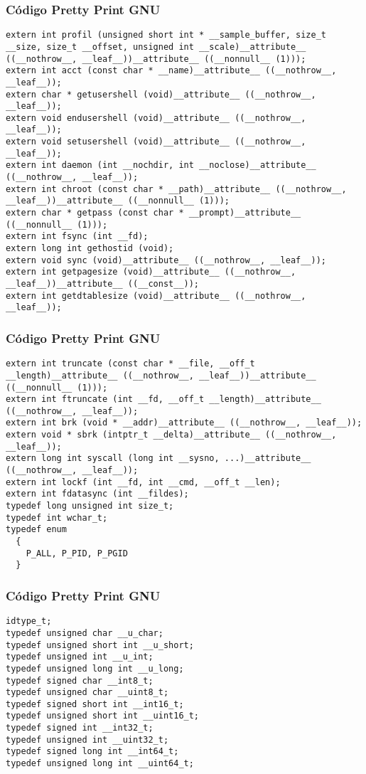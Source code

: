 \documentclass{beamer}
\begin{document}
\begin{frame}[fragile]
\frametitle{C\'odigo Pretty Print GNU}
\begin{verbatim}
extern int profil (unsigned short int * __sample_buffer, size_t __size, size_t __offset, unsigned int __scale)__attribute__ ((__nothrow__, __leaf__))__attribute__ ((__nonnull__ (1)));
extern int acct (const char * __name)__attribute__ ((__nothrow__, __leaf__));
extern char * getusershell (void)__attribute__ ((__nothrow__, __leaf__));
extern void endusershell (void)__attribute__ ((__nothrow__, __leaf__));
extern void setusershell (void)__attribute__ ((__nothrow__, __leaf__));
extern int daemon (int __nochdir, int __noclose)__attribute__ ((__nothrow__, __leaf__));
extern int chroot (const char * __path)__attribute__ ((__nothrow__, __leaf__))__attribute__ ((__nonnull__ (1)));
extern char * getpass (const char * __prompt)__attribute__ ((__nonnull__ (1)));
extern int fsync (int __fd);
extern long int gethostid (void);
extern void sync (void)__attribute__ ((__nothrow__, __leaf__));
extern int getpagesize (void)__attribute__ ((__nothrow__, __leaf__))__attribute__ ((__const__));
extern int getdtablesize (void)__attribute__ ((__nothrow__, __leaf__));
\end{verbatim}
\end{frame}
\begin{frame}[fragile]
\frametitle{C\'odigo Pretty Print GNU}
\begin{verbatim}
extern int truncate (const char * __file, __off_t __length)__attribute__ ((__nothrow__, __leaf__))__attribute__ ((__nonnull__ (1)));
extern int ftruncate (int __fd, __off_t __length)__attribute__ ((__nothrow__, __leaf__));
extern int brk (void * __addr)__attribute__ ((__nothrow__, __leaf__));
extern void * sbrk (intptr_t __delta)__attribute__ ((__nothrow__, __leaf__));
extern long int syscall (long int __sysno, ...)__attribute__ ((__nothrow__, __leaf__));
extern int lockf (int __fd, int __cmd, __off_t __len);
extern int fdatasync (int __fildes);
typedef long unsigned int size_t;
typedef int wchar_t;
typedef enum
  {
    P_ALL, P_PID, P_PGID
  }
\end{verbatim}
\end{frame}
\begin{frame}[fragile]
\frametitle{C\'odigo Pretty Print GNU}
\begin{verbatim}
idtype_t;
typedef unsigned char __u_char;
typedef unsigned short int __u_short;
typedef unsigned int __u_int;
typedef unsigned long int __u_long;
typedef signed char __int8_t;
typedef unsigned char __uint8_t;
typedef signed short int __int16_t;
typedef unsigned short int __uint16_t;
typedef signed int __int32_t;
typedef unsigned int __uint32_t;
typedef signed long int __int64_t;
typedef unsigned long int __uint64_t;
\end{verbatim}
\end{frame}
\end{document}
